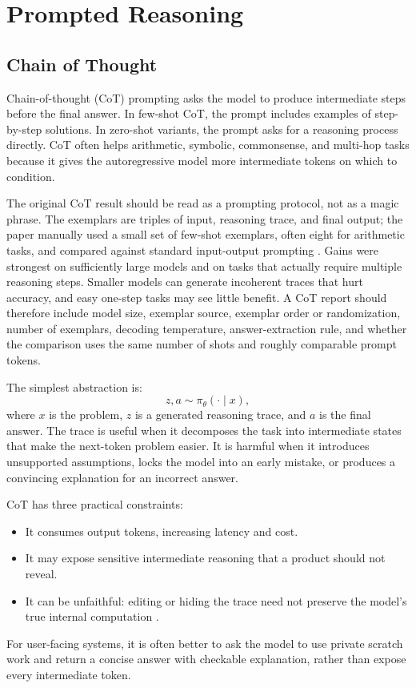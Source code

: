 \section{Prompted Reasoning}
\subsection{Chain of Thought}
Chain-of-thought (CoT) prompting asks the model to produce intermediate steps before the final answer. In few-shot CoT, the prompt includes examples of step-by-step solutions. In zero-shot variants, the prompt asks for a reasoning process directly. CoT often helps arithmetic, symbolic, commonsense, and multi-hop tasks because it gives the autoregressive model more intermediate tokens on which to condition.

The original CoT result should be read as a prompting protocol, not as a magic phrase. The exemplars are triples of input, reasoning trace, and final output; the paper manually used a small set of few-shot exemplars, often eight for arithmetic tasks, and compared against standard input-output prompting \cite{wei2022chain}. Gains were strongest on sufficiently large models and on tasks that actually require multiple reasoning steps. Smaller models can generate incoherent traces that hurt accuracy, and easy one-step tasks may see little benefit. A CoT report should therefore include model size, exemplar source, exemplar order or randomization, number of exemplars, decoding temperature, answer-extraction rule, and whether the comparison uses the same number of shots and roughly comparable prompt tokens.

The simplest abstraction is:
\[
    z, a \sim \pi_\theta(\cdot \mid x),
\]
where $x$ is the problem, $z$ is a generated reasoning trace, and $a$ is the final answer. The trace is useful when it decomposes the task into intermediate states that make the next-token problem easier. It is harmful when it introduces unsupported assumptions, locks the model into an early mistake, or produces a convincing explanation for an incorrect answer.

CoT has three practical constraints:
\begin{itemize}
    \item It consumes output tokens, increasing latency and cost.
    \item It may expose sensitive intermediate reasoning that a product should not reveal.
    \item It can be unfaithful: editing or hiding the trace need not preserve the model's true internal computation \cite{lyu2023faithful}.
\end{itemize}
For user-facing systems, it is often better to ask the model to use private scratch work and return a concise answer with checkable explanation, rather than expose every intermediate token.

